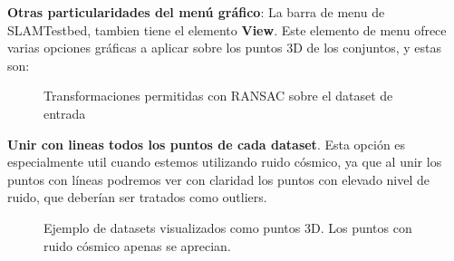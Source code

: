 \textbf{Otras particularidades del menú gráfico}:
La barra de menu de SLAMTestbed, tambien tiene el elemento \textbf{View}. Este elemento de menu ofrece varias opciones gráficas a aplicar sobre los puntos 3D de los conjuntos, y estas son:
\begin{figure}[H]
\begin{center}
\hspace{0.5cm}
\end{center}
\caption{Transformaciones permitidas con RANSAC sobre el dataset de entrada }
\end{figure}
\textbf{Unir con lineas todos los puntos de cada dataset}. Esta opción es especialmente util cuando estemos utilizando ruido cósmico, ya que al unir los puntos con líneas podremos ver con claridad los puntos con elevado nivel de ruido, que deberían ser tratados como outliers.

\begin{figure}[H]
\begin{center}
\hspace{0.5cm}

\end{center}

\caption{Ejemplo de datasets visualizados como puntos 3D. Los puntos con ruido cósmico apenas se aprecian. }
\end{figure}


